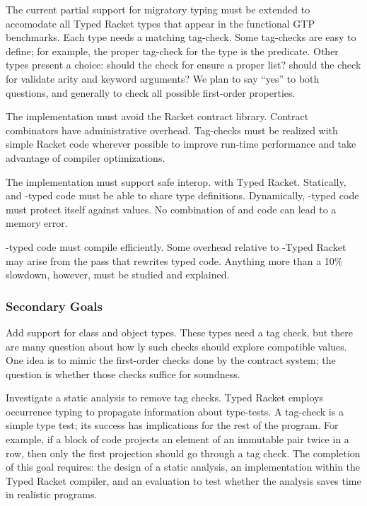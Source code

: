 The current partial support for \tshallow{} migratory typing must be extended to accomodate all Typed Racket types
 that appear in the functional GTP benchmarks.
Each type needs a matching tag-check.
Some tag-checks are easy to define; for example, the proper tag-check for the  type is the  predicate.
Other types present a choice:
 should the check for  ensure a proper list?
 should the check for \racketcode{->*} validate arity and keyword arguments?
We plan to say ``yes'' to both questions, and generally to check all possible first-order properties.

The implementation must avoid the Racket contract library.
Contract combinators have administrative overhead.
Tag-checks must be realized with simple Racket code wherever possible to
improve run-time performance and take advantage of compiler optimizations.

The implementation must support safe interop. with Typed Racket.
Statically, \tshallow{} and \tdeep{}-typed code must be able to share type definitions.
Dynamically, \tdeep{}-typed code must protect itself against \tshallow{} values.
No combination of \tdeep{} and \tshallow{} code can lead to a memory error.

\tShallow{}-typed code must compile efficiently.
Some overhead relative to \tdeep{}-Typed Racket may arise from the pass that
rewrites typed code.
Anything more than a 10\% slowdown, however, must be studied and explained.


\subsubsection{Secondary Goals}

Add support for class and object types.
These types need a tag check, but there are many question about how \tdeep{}ly such
 checks should explore compatible values.
One idea is to mimic the first-order checks done by the contract system;
 the question is whether those checks suffice for soundness.

Investigate a static analysis to remove tag checks.
Typed Racket employs occurrence typing to propagate information about type-tests.
A tag-check is a simple type test; its success has implications for the rest of
the program.
For example, if a block of code projects an element of an immutable pair twice in a row,
 then only the first projection should go through a tag check.
The completion of this goal requires: the design of a static analysis,
 an implementation within the Typed Racket compiler,
 and an evaluation to test whether the analysis saves time in realistic programs.

